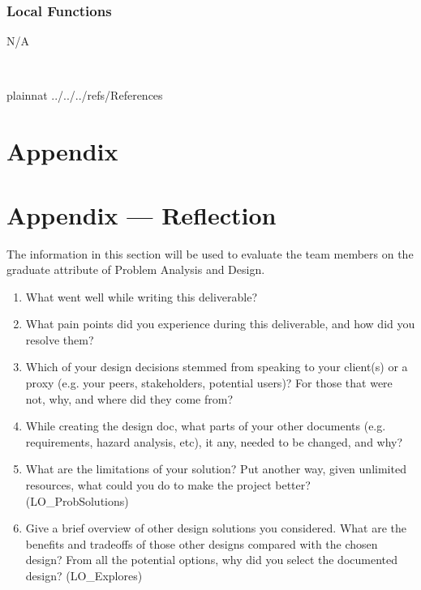 \documentclass[12pt, titlepage]{article}
\begin{document}
\subsubsection{Local Functions}

N/A


\newpage
~\newpage


 {plainnat}
 {../../../refs/References}

\newpage

\section{Appendix} \label{Appendix}


\newpage{}

\section*{Appendix --- Reflection}


The information in this section will be used to evaluate the team members on the
graduate attribute of Problem Analysis and Design.



\begin{enumerate}
  \item What went well while writing this deliverable? 
  \item What pain points did you experience during this deliverable, and how
    did you resolve them?
  \item Which of your design decisions stemmed from speaking to your client(s)
  or a proxy (e.g. your peers, stakeholders, potential users)? For those that
  were not, why, and where did they come from?
  \item While creating the design doc, what parts of your other documents (e.g.
  requirements, hazard analysis, etc), it any, needed to be changed, and why?
  \item What are the limitations of your solution?  Put another way, given
  unlimited resources, what could you do to make the project better? (LO\_ProbSolutions)
  \item Give a brief overview of other design solutions you considered.  What
  are the benefits and tradeoffs of those other designs compared with the chosen
  design?  From all the potential options, why did you select the documented design?
  (LO\_Explores)
\end{enumerate}
\end{document}
